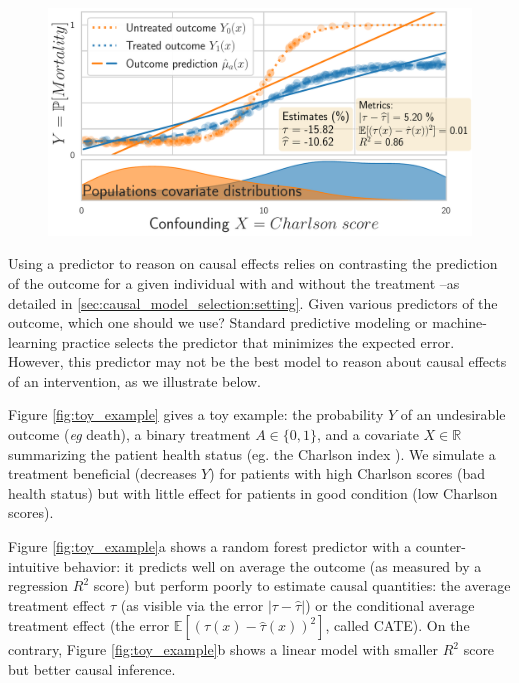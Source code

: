 \documentclass[french,12pt,twoside,a4paper]{book}
\begin{document}
\begin{figure}[t!]
\begin{minipage}{0.65\textwidth}
    \hfill%
    \includegraphics[width=1\linewidth]{img/chapter_5/toy_tlinear_model_small_R2_small_tau_risk.pdf}%
  \end{minipage}
\end{figure}


Using a predictor to reason on causal effects relies on contrasting the
prediction of the outcome for a given individual with and without the
treatment --as detailed in \autoref{sec:causal_model_selection:setting}.
%
Given various predictors of the outcome, which one should we use?
%
Standard predictive modeling or machine-learning practice selects the
predictor that minimizes the expected error.
However, this predictor may not be the best model to reason about
causal effects of an intervention, as we illustrate below.

Figure \ref{fig:toy_example} gives a toy example: the probability $Y$ of
an undesirable
outcome (\emph{eg} death), a binary treatment $A \in \{0, 1\}$, and a covariate
$X \in \mathbb R$ summarizing the patient health status (eg. the
Charlson index \citep{charlson_new_1987}). We simulate a
treatment beneficial (decreases $Y$) for patients with high Charlson scores (bad health
status) but with little effect for patients in good
condition (low Charlson scores).


Figure \ref{fig:toy_example}a shows a random forest predictor with a
counter-intuitive behavior: it predicts well on average the outcome (as measured
by a regression $R^2$ score) but perform poorly to estimate causal quantities:
the average treatment effect $\tau$ (as visible via the error $|\tau -
  \hat{\tau}|$) or the conditional average treatment effect (the error
$\mathbb{E}[(\tau(x) - \hat{\tau}(x))^2]$, called CATE).
%
On the contrary, Figure \ref{fig:toy_example}b shows a linear model with
smaller $R^2$ score but better causal inference.%
\end{document}
